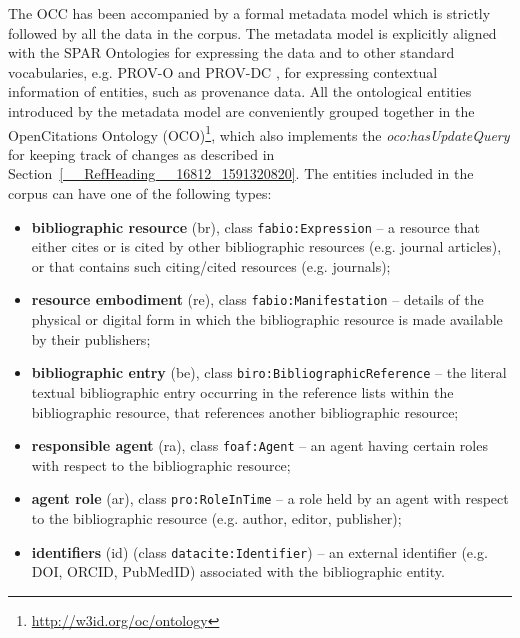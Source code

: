 \documentclass[runningheads,a4paper]{llncs}
\begin{document}
The OCC has been accompanied by a formal metadata model  \cite{__RefNumPara__19064_1591320820} which is strictly followed by all the data in the corpus. The metadata model is explicitly aligned with the SPAR Ontologies  \cite{__RefNumPara__19067_1591320820} for expressing the data and to other standard vocabularies, e.g. PROV-O  \cite{__RefNumPara__17349_1591320820} and PROV-DC  \cite{__RefNumPara__17595_1591320820}, for expressing contextual information of entities, such as provenance data. All the ontological entities introduced by the metadata model are conveniently grouped together in the OpenCitations Ontology (OCO)\footnote{\url{http://w3id.org/oc/ontology}}, which also implements the {\em oco:hasUpdateQuery} for keeping track of changes as described in Section~\ref{__RefHeading__16812_1591320820}. The entities included in the corpus can have one of the following types:
\begin{itemize}
\item {\bf bibliographic resource} (br), class \Verb+fabio:Expression+ -- a resource that either cites or is cited by other bibliographic resources (e.g. journal articles), or that contains such citing/cited resources (e.g. journals);
\item {\bf resource embodiment} (re), class \Verb+fabio:Manifestation+ -- details of the physical or digital form in which the bibliographic resource is made available by their publishers;
\item {\bf bibliographic entry} (be), class \Verb+biro:BibliographicReference+ -- the literal textual bibliographic entry occurring in the reference lists within the bibliographic resource, that references another bibliographic resource;
\item {\bf responsible agent} (ra), class \Verb+foaf:Agent+ -- an agent having certain roles with respect to the bibliographic resource;
\item {\bf agent role} (ar), class \Verb+pro:RoleInTime+ -- a role held by an agent with respect to the bibliographic resource (e.g. author, editor, publisher);
\item {\bf identifiers} (id) (class \Verb+datacite:Identifier+) -- an external identifier (e.g. DOI, ORCID, PubMedID) associated with the bibliographic entity.
\end{itemize}
\end{document}
